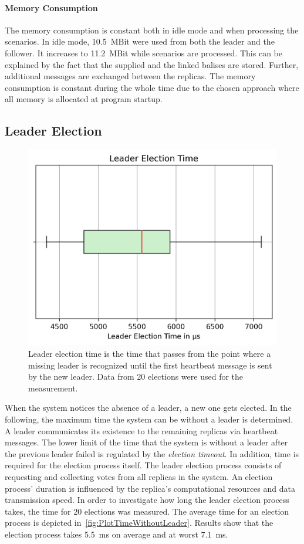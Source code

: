 \paragraph{Memory Consumption}
The memory consumption is constant both in idle mode and when processing the scenarios.
In idle mode, 10.5~MBit were used from both the leader and the follower.
It increases to 11.2~MBit while scenarios are processed.
This can be explained by the fact that the supplied  and the linked balises are stored.
Further, additional messages are exchanged between the replicas.
The memory consumption is constant during the whole time due to the chosen approach where all memory is allocated at program startup.


\subsection{Leader Election}
\label{subsec:LeaderElectionEval}
\begin{figure}[!htb]
	\centering
	\includegraphics[width=0.8\linewidth]{images/plots/timeWithoutLeader}
	\caption{Leader election time is the time that passes from the point where a missing leader is recognized until the first heartbeat message is sent by the new leader. Data from 20 elections were used for the measurement.}
	\label{fig:PlotTimeWithoutLeader}
\end{figure}

When the system notices the absence of a leader, a new one gets elected.
In the following, the maximum time the system can be without a leader is determined.
\\

A leader communicates its existence to the remaining replicas via heartbeat messages.
The lower limit of the time that the system is without a leader after the previous leader failed is regulated by the \textit{election timeout}.
In addition, time is required for the election process itself.
The leader election process consists of requesting and collecting votes from all replicas in the system.
An election process' duration is influenced by the replica's computational resources and data transmission speed.
In order to investigate how long the leader election process takes, the time for 20 elections was measured.
The average time for an election process is depicted in~\autoref{fig:PlotTimeWithoutLeader}.
Results show that the election process takes 5.5~ms on average and at worst 7.1~ms.
\\

